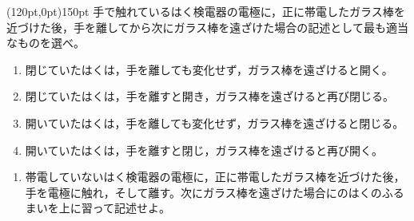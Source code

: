 \hakosyokika
\item
    \begin{mawarikomi}[10](120pt,0pt){150pt}{}
        手で触れているはく検電器の電極に，正に帯電したガラス棒を近づけた後，手を離してから次にガラス棒を遠ざけた場合の記述として最も適当なものを選べ。
        \begin{enumerate}[m]
            \item 閉じていたはくは，手を離しても変化せず，ガラス棒を遠ざけると開く。
            \item 閉じていたはくは，手を離すと開き，ガラス棒を遠ざけると再び閉じる。
            \item 開いていたはくは，手を離しても変化せず，ガラス棒を遠ざけると閉じる。
            \item 開いていたはくは，手を離すと閉じ，ガラス棒を遠ざけると再び開く。
        \end{enumerate}
        \begin{enumerate}
            \item 帯電していないはく検電器の電極に，正に帯電したガラス棒を近づけた後，手を電極に触れ，そして離す。次にガラス棒を遠ざけた場合にのはくのふるまいを上に習って記述せよ。
        \end{enumerate}
    \end{mawarikomi}
